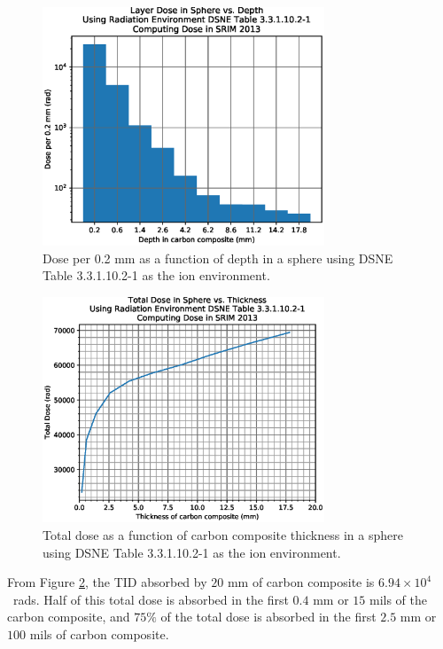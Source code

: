 \documentclass{hitec}
\begin{document}
\begin{figure}[h!]
	\centering
	\includegraphics[width=0.75\textwidth]{LayerDoseinSphere_vs_Depth.eps}
	\caption{Dose per 0.2 mm as a function of depth in a sphere using DSNE Table 3.3.1.10.2-1 as the ion environment.}\label{fig:LayerDoseinSphere_vs_Depth}
\end{figure}

\begin{figure}[h!]
	\centering
	\includegraphics[width=0.75\textwidth]{TotalDoseinSphere_vs_Thickness.eps}
	\caption{Total dose as a function of carbon composite thickness in a sphere using DSNE Table 3.3.1.10.2-1 as the ion environment.}\label{fig:TotalDoseinSphere_vs_Thickness}
\end{figure}

From Figure \ref{fig:TotalDoseinSphere_vs_Thickness}, the TID absorbed by $20$ mm of carbon composite is $6.94\times 10^{4}$~rads. Half of this total dose is absorbed in the first $0.4$ mm or $15$ mils of the carbon composite, and $75\%$ of the total dose is absorbed in the first $2.5$ mm or $100$ mils of carbon composite.
\end{document}
